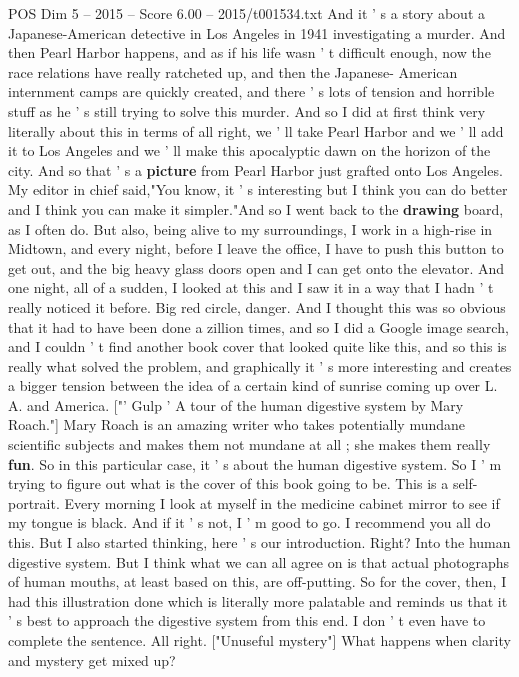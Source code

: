 \begin{textsample}{POS Dim 5 – 2015 – Score 6.00 – 2015/t001534.txt}
And it ' s a story about a Japanese-American detective in Los Angeles in 1941 investigating a murder.
And then Pearl Harbor happens, and as if his life wasn ' t difficult enough, now the race relations have really ratcheted up, and then the Japanese- American internment camps are quickly created, and there ' s lots of tension and horrible stuff as he ' s still trying to solve this murder.
And so I did at first think very literally about this in terms of all right, we ' ll take Pearl Harbor and we ' ll add it to Los Angeles and we ' ll make this apocalyptic dawn on the horizon of the city.
And so that ' s a \textbf{picture} from Pearl Harbor just grafted onto Los Angeles.
My editor in chief said,"You know, it ' s interesting but I think you can do better and I think you can make it simpler."And so I went back to the \textbf{drawing} board, as I often do.
But also, being alive to my surroundings, I work in a high-rise in Midtown, and every night, before I leave the office, I have to push this button to get out, and the big heavy glass doors open and I can get onto the elevator.
And one night, all of a sudden, I looked at this and I saw it in a way that I hadn ' t really noticed it before.
Big red circle, danger.
And I thought this was so obvious that it had to have been done a zillion times, and so I did a Google image search, and I couldn ' t find another book cover that looked quite like this, and so this is really what solved the problem, and graphically it ' s more interesting and creates a bigger tension between the idea of a certain kind of sunrise coming up over L.
A. and America. ["' Gulp ' A tour of the human digestive system by Mary Roach."] Mary Roach is an amazing writer who takes potentially mundane scientific subjects and makes them not mundane at all ; she makes them really \textbf{fun}.
So in this particular case, it ' s about the human digestive system.
So I ' m trying to figure out what is the cover of this book going to be.
This is a self-portrait.
Every morning I look at myself in the medicine cabinet mirror to see if my tongue is black.
And if it ' s not, I ' m good to go.
I recommend you all do this.
But I also started thinking, here ' s our introduction.
Right?
Into the human digestive system.
But I think what we can all agree on is that actual photographs of human mouths, at least based on this, are off-putting.
So for the cover, then, I had this illustration done which is literally more palatable and reminds us that it ' s best to approach the digestive system from this end.
I don ' t even have to complete the sentence.
All right. ["Unuseful mystery"] What happens when clarity and mystery get mixed up?

\end{textsample}
